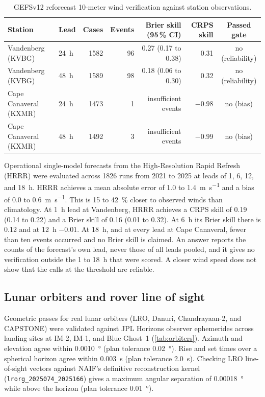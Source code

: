 \documentclass[11pt,a4paper]{article}
\begin{document}
\begin{table}[htbp]
\centering\small
\caption{GEFSv12 reforecast 10-meter wind verification against station observations.}
\label{tab:brier}
\setlength{\tabcolsep}{4.5pt}
\begin{tabular}{@{}llrrrrc@{}}
\toprule
Station & Lead & Cases & Events & Brier skill (95\,\% CI) & CRPS skill & Passed gate \\
\midrule
Vandenberg (KVBG) & \qty{24}{\hour} & \num{1582} & 96 & 0.27 (0.17 to 0.38) & 0.31 & no (reliability) \\
Vandenberg (KVBG) & \qty{48}{\hour} & \num{1589} & 98 & 0.18 (0.06 to 0.30) & 0.32 & no (reliability) \\
Cape Canaveral (KXMR) & \qty{24}{\hour} & \num{1473} & 1 & insufficient events & $-0.98$ & no (bias) \\
Cape Canaveral (KXMR) & \qty{48}{\hour} & \num{1492} & 3 & insufficient events & $-0.99$ & no (bias) \\
\bottomrule
\end{tabular}
\end{table}

Operational single-model forecasts from the High-Resolution Rapid Refresh (HRRR) were
evaluated across \num{1826} runs from 2021 to 2025 at leads of 1, 6, 12, and \qty{18}{\hour}.
HRRR achieves a mean absolute error of 1.0 to \qty{1.4}{\m\per\s} and a bias of 0.0 to
\qty{0.6}{\m\per\s}. This is 15 to \qty{42}{\percent} closer to observed winds than climatology.
At \qty{1}{\hour} lead at Vandenberg, HRRR achieves a CRPS skill of 0.19 (0.14 to 0.22) and a
Brier skill of 0.16 (0.01 to 0.32). At \qty{6}{\hour} its Brier skill there is 0.12 and at
\qty{12}{\hour} $-0.01$. At \qty{18}{\hour}, and at every lead at Cape Canaveral, fewer than ten
events occurred and no Brier skill is claimed. An answer reports the counts of the forecast's
own lead, never those of all leads pooled, and it gives no verification outside the 1 to
\qty{18}{\hour} that were scored. A closer wind speed does not show that the calls at the
threshold are reliable.

\subsection{Lunar orbiters and rover line of sight}

Geometric passes for real lunar orbiters (LRO, Danuri, Chandrayaan-2, and CAPSTONE) were
validated against JPL Horizons observer ephemerides across landing sites at IM-2, IM-1, and
Blue Ghost~1 (\cref{tab:orbiters}). Azimuth and elevation agree within \qty{0.0010}{\degree}
(plan tolerance \qty{0.02}{\degree}). Rise and set times over a spherical horizon agree within
\qty{0.003}{\s} (plan tolerance \qty{2.0}{\s}). Checking LRO line-of-sight vectors against
NAIF's definitive reconstruction kernel (\texttt{lrorg\_2025074\_2025166}) gives a maximum angular
separation of \qty{0.00018}{\degree} while above the horizon (plan tolerance \qty{0.01}{\degree}).
\end{document}
